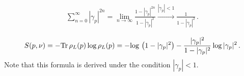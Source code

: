 \begin{eqnarray}
\sum_{n=0}^\infty |\gamma_p |^{2n}=\lim_{n\rightarrow\infty}\frac{1-|\gamma_p|^{2n}}{1-|\gamma_p|^2}\xrightarrow{|\gamma_p|<1}\frac{1}{1-|\gamma_p|^2}\,.
\end{eqnarray}


\begin{eqnarray}
S(p,\nu)=-{\rm Tr}\,\rho_L(p)\,{\rm log}\,\rho_L(p)
=-{\rm log}\,\left(1-|\gamma_p|^2\right)
-\frac{|\gamma_p|^2}{1-|\gamma_p|^2}\,{\rm log}\,|\gamma_p|^2\,.
\label{s}
\end{eqnarray}
Note that this formula is derived under the condition $|\gamma_p|<1$.
